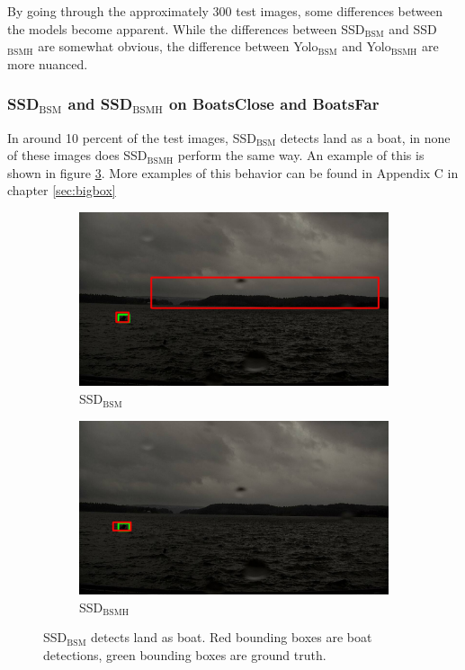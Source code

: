 \vspace{3mm}

By going through the approximately 300 test images, some differences between the models become apparent. While the differences between SSD$_{\text{BSM}}$ and SSD$_{\text{BSMH}}$ are somewhat obvious, the difference between Yolo$_{\text{BSM}}$ and Yolo$_{\text{BSMH}}$ are more nuanced. 

\subsubsection{SSD$_{\text{BSM}}$ and SSD$_{\text{BSMH}}$ on BoatsClose and BoatsFar}
In around 10 percent of the test images, SSD$_{\text{BSM}}$ detects land as a boat, in none of these images does SSD$_{\text{BSMH}}$ perform the same way. An example of this is shown in figure \ref{img:bixbox_ssd}. More examples of this behavior can be found in Appendix C in chapter \ref{sec:bigbox}

\begin{figure}[h!]
\begin{subfigure}{.5\textwidth}
  \centering
  \includegraphics[width=0.9\linewidth]{results/case_buildings/bigbox_bcbf/SSD2/selected_06_14_axis0049.jpg}
  \caption{SSD$_{\text{BSM}}$}
  \label{fig:big_box_ssd2}
\end{subfigure}%
\begin{subfigure}{.5\textwidth}
  \centering
  \includegraphics[width=.9\linewidth]{results/case_buildings/bigbox_bcbf/SSD3/selected_06_14_axis0049.jpg}
  \caption{SSD$_{\text{BSMH}}$}
  \label{fig:big_box_ssd3}
\end{subfigure}
\caption{SSD$_{\text{BSM}}$ detects land as boat. Red bounding boxes are boat detections, green bounding boxes are ground truth.}
\label{img:bixbox_ssd}
\end{figure}

